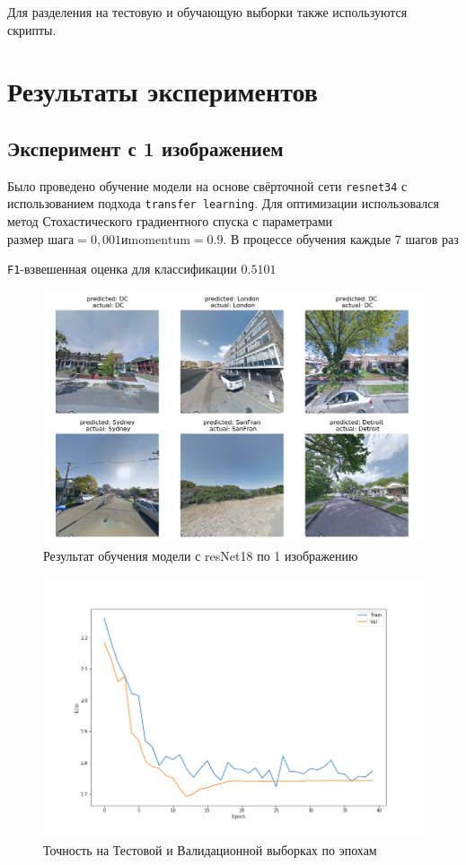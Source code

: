 Для разделения на тестовую и обучающую выборки также используются скрипты.

\section{Результаты экспериментов}

\subsection{Эксперимент с 1 изображением}

Было проведено обучение модели на основе свёрточной сети \texttt{resnet34} с использованием подхода \texttt{transfer learning}. Для оптимизации использовался 
метод Стохастического градиентного спуска с параметрами $ \mbox{размер шага} = 0,001 и \mbox{momentum} = 0.9$. В процессе обучения каждые 7 шагов раз

\texttt{F1}-взвешенная оценка для классификации $ 0.5101 $

\begin{figure}
	\centering
	\includegraphics[width=0.9\linewidth]{img/res1im}
	\caption{Результат обучения модели с resNet18 по 1 изображению}
	\label{fig:res1im}
\end{figure}

\begin{figure}[h]
	\centering
	\includegraphics[width=0.8\linewidth]{img/train1im}
	\caption{Точность на Тестовой и Валидационной выборках по эпохам}
	\label{fig:train1im}
\end{figure}


